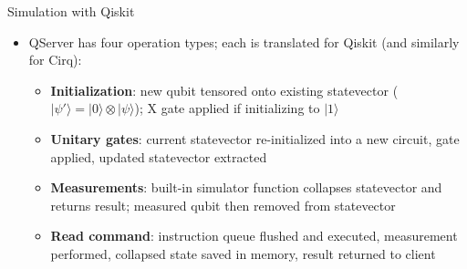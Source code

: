 \documentclass{beamer}
\begin{document}
\begin{frame}{Simulation with Qiskit}
  \begin{itemize}
    \item QServer has four operation types; each is translated for Qiskit (and similarly for Cirq):
    \begin{itemize}
      \item \textbf{Initialization}: new qubit tensored onto existing statevector ($|\psi'\rangle = |0\rangle \otimes |\psi\rangle$); X gate applied if initializing to $|1\rangle$
      \item \textbf{Unitary gates}: current statevector re-initialized into a new circuit, gate applied, updated statevector extracted
      \item \textbf{Measurements}: built-in simulator function collapses statevector and returns result; measured qubit then removed from statevector
      \item \textbf{Read command}: instruction queue flushed and executed, measurement performed, collapsed state saved in memory, result returned to client
    \end{itemize}
  \end{itemize}
\end{frame}
\end{document}
